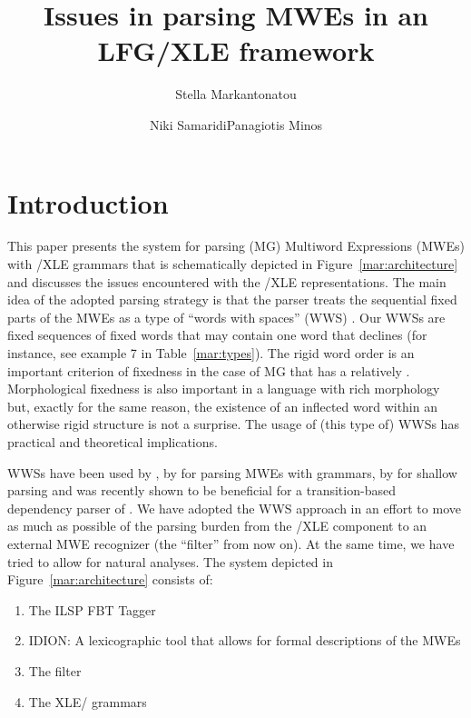\documentclass[output=paper]{langsci/langscibook}
\title{Issues in parsing MWEs in an LFG/XLE framework}
\author{Stella Markantonatou\affiliation{Institute for Language and Speech Processing\slash Athena RIC}\and Niki Samaridi\affiliation{Institute for Language and Speech Processing\slash Athena RIC}\lastand Panagiotis Minos\affiliation{Institute for Language and Speech Processing\slash Athena RIC}}
\begin{document}
\maketitle

\section{Introduction} 
This paper presents the system for parsing  (MG) Multiword Expressions (MWEs) with /XLE grammars that is schematically depicted in Figure~\ref{mar:architecture} and discusses the issues encountered with the /XLE representations. The main idea of the adopted parsing strategy is that the parser treats the sequential fixed parts of the MWEs as a type of ``words with spaces” (WWS) \citep{sag02}. Our  WWSs are fixed sequences of fixed words that may contain one word that declines (for instance, see example 7 in Table~\ref{mar:types}). The rigid word order is an important criterion of fixedness in the case of MG that has a relatively . Morphological fixedness is also important in a language with rich morphology but, exactly for the same reason, the existence of an inflected word within an otherwise rigid structure is not a surprise. The usage of (this type of) WWSs has practical and theoretical implications. 

WWSs have been used by \cite{copestakeetal2002}, by \cite{attia2006} for parsing  MWEs with  grammars, by \cite{korkontzelosetal2010} for shallow parsing and was recently shown to be beneficial for a transition-based dependency  parser of  \citep{apidianaki2018}. We have adopted the WWS approach in an effort to move as much as possible of the parsing burden from the /XLE component to an external MWE recognizer (the ``filter'' from now on). At the same time, we have tried to allow for natural  analyses. 
The system depicted in Figure~\ref{mar:architecture} consists of:
\begin{enumerate}
\item The ILSP FBT Tagger
\item IDION:  A lexicographic tool that allows for formal descriptions of the MWEs 
\item The filter
\item The XLE/ grammars
\end{enumerate}

\vspace{-.5cm}
\end{document}
